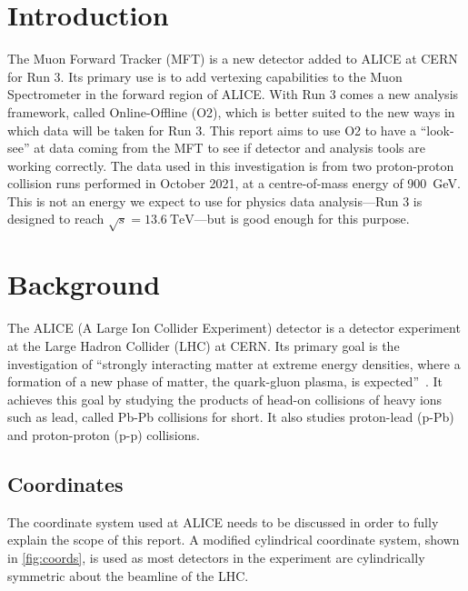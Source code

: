 \documentclass[11pt]{article}
\numberwithin{equation}{section}
\numberwithin{figure}{section}
\numberwithin{table}{section}
\begin{document}
\section{Introduction}
The Muon Forward Tracker (MFT) is a new detector added to ALICE at CERN for Run 3. Its primary use is to add vertexing capabilities to the Muon Spectrometer in the forward region of ALICE. With Run 3 comes a new analysis framework, called Online-Offline (O2), which is better suited to the new ways in which data will be taken for Run 3. This report aims to use O2 to have a ``look-see'' at data coming from the MFT to see if detector and analysis tools are working correctly. The data used in this investigation is from two proton-proton collision runs performed in October 2021, at a centre-of-mass energy of \SI{900}{\giga\electronvolt}. This is not an energy we expect to use for physics data analysis---Run 3 is designed to reach $\sqrt{s}=\SI{13.6}{\tera\electronvolt}$---but is good enough for this purpose.


\section{Background}
The ALICE (A Large Ion Collider Experiment) detector is a detector experiment at the Large Hadron Collider (LHC) at CERN. Its primary goal is the investigation of ``strongly interacting matter at extreme energy densities, where a formation of a new phase of matter, the quark-gluon plasma, is expected''~\cite{ALICE_LOI}. It achieves this goal by studying the products of head-on collisions of heavy ions such as lead, called Pb-Pb collisions for short. It also studies proton-lead (p-Pb) and proton-proton (p-p) collisions.  



\subsection{Coordinates}
The coordinate system used at ALICE needs to be discussed in order to fully explain the scope of this report. A modified cylindrical coordinate system, shown in \cref{fig:coords}, is used as most detectors in the experiment are cylindrically symmetric about the beamline of the LHC. 
\end{document}
